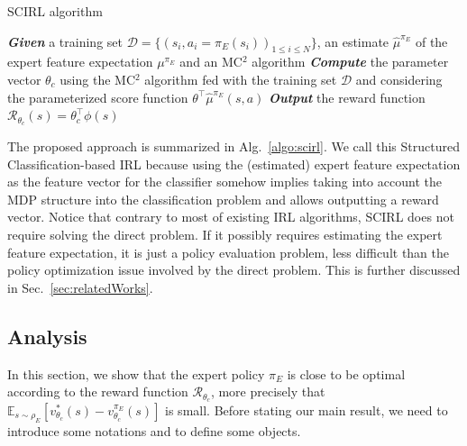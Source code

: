 \documentclass[english,utf8]{./hermes-journal}
\newcommand{\R}{\mathcal{R}}
\newcommand{\D}{\mathcal{D}}
\newcommand{\E}{\mathbb{E}}
\begin{document}
\begin{algorithm2e}%
  \SetAlgoVlined
  \caption{SCIRL algorithm}
  \label{algo:scirl}
  \BlankLine
  \emph{\textbf{Given}} a training set $\D = \{(s_i,a_i=\pi_E(s_i))_{1\leq i\leq N}\}$,
  an estimate $\hat{\mu}^{\pi_E}$ of the expert feature expectation $\mu^{\pi_E}$ and an MC$^2$ algorithm\;
  \BlankLine
  \emph{\textbf{Compute}} the parameter vector $\theta_c$ using the
  MC$^2$ algorithm
  fed with the training set $\D$ and considering the parameterized score function
  $\theta^\top\hat{\mu}^{\pi_E}(s,a)$\;
  \BlankLine
  \emph{\textbf{Output}} the reward function $\R_{\theta_c}(s) = \theta_c^\top\phi(s)$ \;
\end{algorithm2e}

The proposed approach is summarized in Alg.~\ref{algo:scirl}. We
call this Structured Classification-based IRL because using the
(estimated) expert feature expectation as the feature vector for the
classifier somehow implies taking into account the MDP structure
into the classification problem and allows outputting a reward
vector. Notice that contrary to most of existing IRL
algorithms, SCIRL does not require solving the direct problem. If it
possibly requires estimating the expert feature expectation, it is
just a policy evaluation problem, less difficult than the policy
optimization issue involved by the direct problem. This is further
discussed in Sec.~\ref{sec:relatedWorks}.
%


\subsection{Analysis}
\label{subsec:scirl:analysis}

In this section, we show that the expert policy $\pi_E$ is close to
be optimal according to the reward function $\R_{\theta_c}$, more
precisely that
$\E_{s\sim\rho_E}[v^*_{\theta_c}(s)-v^{\pi_E}_{\theta_c}(s)]$ is
small. Before stating our main result, we need to introduce some
notations and to define some objects.
\end{document}
